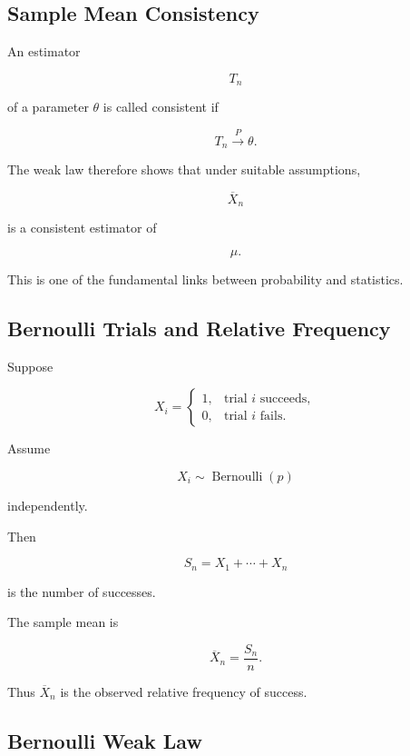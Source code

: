 \subsection{Sample Mean Consistency}
\label{subsec:sample-mean-consistency}

An estimator

\[
T_n
\]

of a parameter \(\theta\) is called consistent if

\[
\boxed{
T_n
\xrightarrow{P}
\theta.
}
\]

The weak law therefore shows that under suitable assumptions,

\[
\boxed{
\overline{X}_n
}
\]

is a consistent estimator of

\[
\mu.
\]

This is one of the fundamental links between probability and statistics.

\subsection{Bernoulli Trials and Relative Frequency}
\label{subsec:bernoulli-relative-frequency}

Suppose

\[
X_i
=
\begin{cases}
1,&\text{trial \(i\) succeeds},\\
0,&\text{trial \(i\) fails}.
\end{cases}
\]

Assume

\[
X_i
\sim
\operatorname{Bernoulli}(p)
\]

independently.

Then

\[
S_n
=
X_1+\cdots+X_n
\]

is the number of successes.

The sample mean is

\[
\overline{X}_n
=
\frac{S_n}{n}.
\]

Thus \(\overline{X}_n\) is the observed relative frequency of success.

\subsection{Bernoulli Weak Law}
\label{subsec:bernoulli-weak-law}

